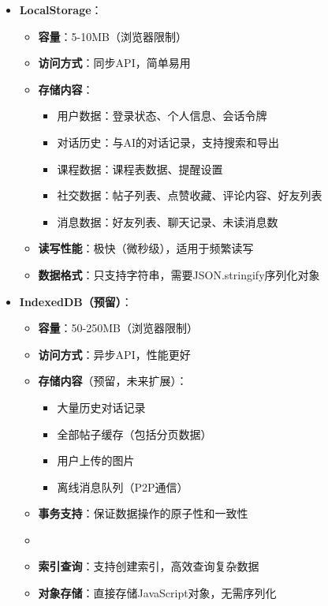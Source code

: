 \documentclass[12pt,a4paper]{article}
\begin{document}
\begin{itemize}
    \item \textbf{LocalStorage}：
        \begin{itemize}
            \item \textbf{容量}：5-10MB（浏览器限制）
            \item \textbf{访问方式}：同步API，简单易用
            \item \textbf{存储内容}：
                \begin{itemize}
                    \item 用户数据：登录状态、个人信息、会话令牌
                    \item 对话历史：与AI的对话记录，支持搜索和导出
                    \item 课程数据：课程表数据、提醒设置
                    \item 社交数据：帖子列表、点赞收藏、评论内容、好友列表
                    \item 消息数据：好友列表、聊天记录、未读消息数
                \end{itemize}
            \item \textbf{读写性能}：极快（微秒级），适用于频繁读写
            \item \textbf{数据格式}：只支持字符串，需要JSON.stringify序列化对象
        \end{itemize}
    
    \item \textbf{IndexedDB（预留）}：
        \begin{itemize}
            \item \textbf{容量}：50-250MB（浏览器限制）
            \item \textbf{访问方式}：异步API，性能更好
            \item \textbf{存储内容}（预留，未来扩展）：
                \begin{itemize}
                    \item 大量历史对话记录
                    \item 全部帖子缓存（包括分页数据）
                    \item 用户上传的图片
                    \item 离线消息队列（P2P通信）
                \end{itemize}
            \item \textbf{事务支持}：保证数据操作的原子性和一致性
            \item \item \textbf{索引查询}：支持创建索引，高效查询复杂数据
            \item \textbf{对象存储}：直接存储JavaScript对象，无需序列化
        \end{itemize}
    

\end{itemize}
\end{document}
